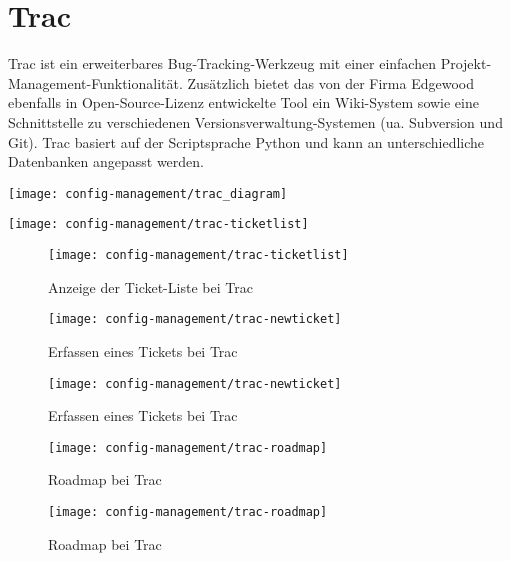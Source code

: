 %
%
\section{Trac}
\begin{minipage}{0.55\linewidth}
Trac ist ein erweiterbares Bug-Tracking-Werkzeug mit einer einfachen
Projekt-Management-Funktionalität.
Zusätzlich bietet das von der Firma Edgewood ebenfalls in
Open-Source-Lizenz entwickelte Tool
ein Wiki-System sowie eine Schnittstelle zu verschiedenen Versionsverwaltung-Systemen
(ua. Subversion und Git). Trac basiert auf der Scriptsprache Python und kann
an unterschiedliche Datenbanken angepasst werden.
\end{minipage}
\hfill
\begin{minipage}{0.4\linewidth}
\texttt{[image: config-management/trac\_diagram]}
\end{minipage}
%
\ifslides
\begin{center}
\texttt{[image: config-management/trac-ticketlist]}
\end{center}
\else
\begin{figure}[H]
\texttt{[image: config-management/trac-ticketlist]}
\caption{Anzeige der Ticket-Liste bei Trac}
\end{figure}
\fi
\ifslides
\begin{figure}[H]
\begin{center}
\texttt{[image: config-management/trac-newticket]}
\caption{Erfassen eines Tickets bei Trac}
\end{center}
\end{figure}
\else
\begin{figure}[H]
\begin{center}
\texttt{[image: config-management/trac-newticket]}
\caption{Erfassen eines Tickets bei Trac}
\end{center}
\end{figure}
\fi
%
\ifslides
\begin{figure}[H]
\begin{center}
\texttt{[image: config-management/trac-roadmap]}
\caption{Roadmap bei Trac}
\end{center}
\end{figure}
\else
\begin{figure}[H]
\begin{center}
\texttt{[image: config-management/trac-roadmap]}
\caption{Roadmap bei Trac}
\end{center}
\end{figure}
\fi
